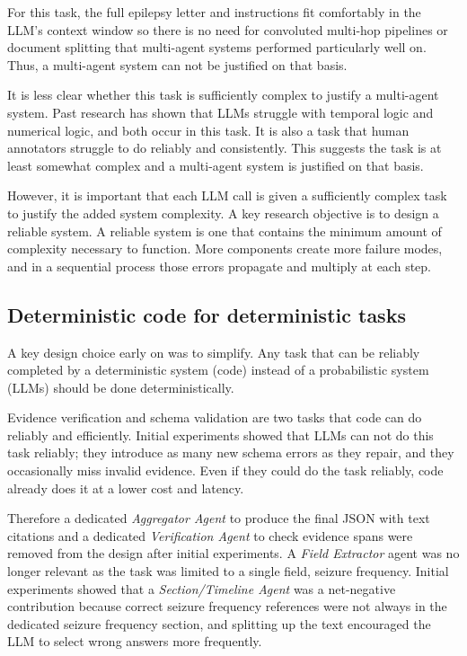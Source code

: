 \documentclass[conference]{IEEEtran}
\begin{document}
For this task, the full epilepsy letter and instructions 
fit comfortably in the LLM's context window so there
is no need for convoluted multi-hop pipelines or 
document splitting that multi-agent systems 
performed particularly well on\cite{b14}. Thus, a 
multi-agent system can not be justified on that basis.

It is less clear whether this task is sufficiently complex
to justify a multi-agent system. Past research has 
shown that LLMs struggle with temporal logic and 
numerical logic, and both occur in this task. It is
also a task that human annotators struggle to do
reliably and consistently\cite{b3}. This suggests the task 
is at least somewhat complex and a multi-agent
system is justified on that basis.

However, it is important that each LLM call is given
a sufficiently complex task to justify the added system
complexity. A key research objective is to design 
a reliable system. A reliable system is one that 
contains the minimum amount of complexity 
necessary to function. More components create 
more failure modes, and in a sequential 
process those errors propagate and multiply at 
each step. 

\subsection{Deterministic code for deterministic tasks}

A key design choice early on was to simplify. Any
task that can be reliably completed by a deterministic
system (code) instead of a probabilistic system (LLMs)
should be done deterministically. 

Evidence verification and schema validation are two 
tasks that code can do reliably and efficiently. Initial 
experiments showed that LLMs can not do this task 
reliably; they introduce as many new schema errors 
as they repair, and they occasionally miss invalid 
evidence. Even if they could do the task
reliably, code already does it at a lower
cost and latency. 

Therefore a dedicated \emph{Aggregator Agent} to produce
the final JSON with text citations and a dedicated 
\emph{Verification Agent} to check evidence spans were 
removed from the design after initial experiments.
A \emph{Field Extractor} agent was no longer relevant as 
the task was limited to a single field, seizure 
frequency. Initial experiments showed that a 
\emph{Section/Timeline Agent} was a net-negative 
contribution because correct seizure frequency 
references were not always in the dedicated 
seizure frequency section, and splitting up the 
text encouraged the LLM to select wrong answers
more frequently.
\end{document}
